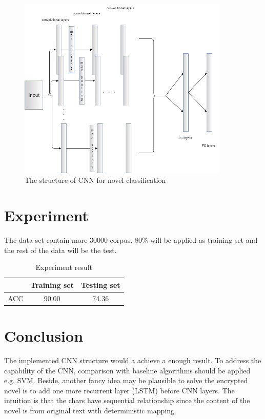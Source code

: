 \documentclass[a4paper]{article}
\begin{document}
\begin{figure}
\begin{center}
\includegraphics[width=10cm]{CNN_structure.png}
\end{center}
\caption{The structure of CNN for novel classification}\label{cnn}
\end{figure}

\section{Experiment}\label{exp}

The data set contain more 30000 corpus. 80\% will be applied as training set and the rest of the data will be the test.
\begin{table}
\centering
\begin{tabular}{|c|c|c|}
  \hline
   {} & Training set & Testing set \\
  \hline
  ACC & 90.00 & 74.36 \\
  \hline
\end{tabular}\caption{Experiment result}
\end{table}
\section{Conclusion}\label{conclusion}
The implemented CNN structure would a achieve a enough result. To address the capability of the CNN, comparison with baseline algorithms should be applied e.g. SVM. Beside, another fancy idea may be plausible to solve the encrypted novel is to add one more recurrent layer (LSTM) before CNN layers. The intuition is that the chars have sequential relationship since the content of the novel is from original text with deterministic mapping.



\end{document}
